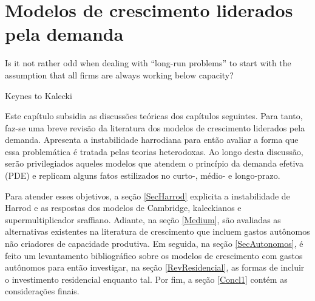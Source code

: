 \chapter{Modelos de crescimento liderados pela demanda}
\label{CapTeorico}

\epigraph{Is it not rather odd when dealing with ``long-run problems'' to start with the assumption that all firms are always working below capacity?}{Keynes to Kalecki}


Este capítulo subsidia as discussões teóricas dos capítulos seguintes.
Para tanto, faz-se uma breve revisão da literatura dos modelos de crescimento liderados pela demanda. Apresenta a instabilidade harrodiana para então avaliar a forma que essa problemática é tratada pelas teorias heterodoxas.
Ao longo desta discussão, serão privilegiados aqueles modelos que atendem o princípio da demanda efetiva (PDE)  e replicam alguns fatos estilizados no curto-, médio- e longo-prazo.


Para atender esses objetivos, a seção \ref{SecHarrod} explicita a instabilidade de Harrod e as respostas dos modelos de Cambridge, kaleckianos e supermultiplicador sraffiano. 
Adiante, na seção \ref{Medium}, são avaliadas as alternativas existentes na literatura de crescimento que incluem gastos autônomos não criadores de capacidade produtiva.
Em seguida, na seção \ref{SecAutonomos}, é feito um levantamento bibliográfico sobre os modelos de crescimento com gastos autônomos para então investigar, na seção \ref{RevResidencial}, as formas de incluir o investimento residencial enquanto tal.
Por fim, a seção \ref{Concl1} contém as considerações finais.




%



\begin{comment}
mais especificamente:
\begin{itemize}
\item \textbf{Curto-prazo:} Determinação da poupança pelo investimento \cite{keynes_general_1936};
\item \textbf{Médio-prazo:} Relação positiva entre taxa de investimento e crescimento \cite{cesaratto_neo-kaleckian_2015};
\item \textbf{Longo-prazo:} Convergência ao grau de utilização ao normal\footnote{Por grau de utilização normal, adota-se a definição de \textcites[p.~423--4, Original de 1986]{ciccone_2017}: ``\textit{The `normal' utilization of capacity can therefore imply not only the expectation of a certain breadth and frequency of the fluctuations in demand, but also the expectation of the idleness of the excess capacity deliberately chosen by the entrepreneurs;}'' } \cites{ciccone_2017}{vianello_pace_1985}.
\end{itemize}
\end{comment}